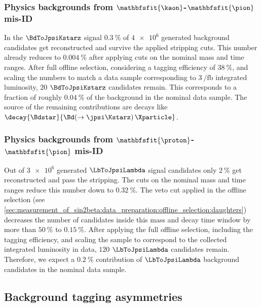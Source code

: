 \subsubsection{Physics backgrounds from $\mathbfsfit{\kaon}$-$\mathbfsfit{\pion}$ mis-ID}
\label{sec:measurement_of_sin2beta:physic_backgrounds:physic_backgrounds:kstar}

In the $\BdToJpsiKstarz$ signal \MC $\SI{0.3}{\percent}$ of $\num{4e6}$ generated
background candidates get reconstructed and survive the applied stripping cuts.
This number already reduces to $\SI{0.004}{\percent}$ after applying cuts on the
nominal mass and time ranges. After full offline selection, considering a
tagging efficiency of $\SI{38}{\percent}$, and scaling the numbers to match a
data sample corresponding to
$\SI[separate-uncertainty=true]{3}{\per\femto\barn}$ integrated luminosity,
$\num{20}$ $\BdToJpsiKstarz$ candidates remain. This corresponds to a fraction of
roughly $\SI{0.04}{\percent}$ of the background in the nominal data sample. The
source of the remaining contributions are \eg decays like
$\decay{\Bdstar}{\Bd(\to\jpsi\Kstarz)\,\Xparticle}$.

\subsubsection{Physics backgrounds from $\mathbfsfit{\proton}$-$\mathbfsfit{\pion}$ mis-ID}
\label{sec:measurement_of_sin2beta:physic_backgrounds:physic_backgrounds:lambda}

Out of $\num{3e6}$ generated $\LbToJpsiLambda$ signal candidates only
$\SI{2}{\percent}$ get reconstructed and pass the stripping. The cuts on the
nominal mass and time ranges reduce this number down to $\SI{0.32}{\percent}$.
The veto cut applied in the offline selection (see
\cref{sec:measurement_of_sin2beta:data_preparation:offline_selection:daughters})
decreases the number of candidates inside this mass and decay time window by
more than $\SI{50}{\percent}$ to $\SI{0.15}{\percent}$. After applying the full
offline selection, including the tagging efficiency, and scaling the sample to
correspond to the collected integrated luminosity in data, $\num{120}$
$\LbToJpsiLambda$ candidates remain. Therefore, we expect a $\SI{0.2}{\percent}$
contribution of $\LbToJpsiLambda$ background candidates in the nominal data
sample.

\subsection{Background tagging asymmetries}
\label{sec:measurement_of_sin2beta:physic_backgrounds:tagging_asymmetries}

